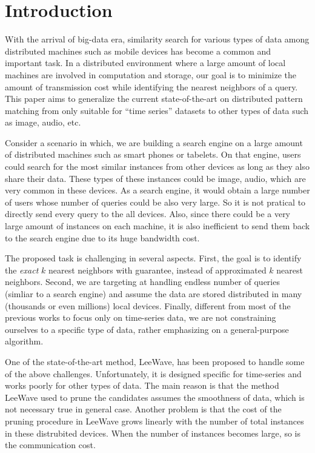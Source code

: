 \chapter{Introduction}
\label{c:intro}

With the arrival of big-data era, similarity search for various types of data among distributed machines such as  mobile devices has become a common and important task.  In a distributed environment where a large amount of local machines are involved in computation and storage, our goal is to minimize the amount of transmission cost while identifying the nearest neighbors of a query. This paper aims to generalize the current state-of-the-art on distributed pattern matching from only suitable for ``time series''  datasets to other types of data such as image, audio, etc.


Consider a scenario in which, we are building a search engine on a large amount of distributed machines such as smart phones or tabelets.  On that engine, users could search for the most similar instances from other devices as long as they also share their data.  These types of these instances could be image, audio, which are very common in these devices. As a search engine, it would obtain a large number of users whose number of queries could be also very large.  So it is not pratical to directly send every query to the all devices.  Also, since there could be a very large amount of instances on each machine, it is also inefficient to send them back to the search engine due to its huge bandwidth cost.

The proposed task is challenging in several aspects. First, the goal is to identify the \emph{exact} $k$ nearest neighbors with guarantee, instead of approximated $k$ nearest neighbors.  Second, we are targeting at handling endless number of queries (simliar to a search engine) and assume the data are stored distributed in many (thousands or even millions) local devices.  Finally, different from most of the previous works to focus only on time-series data, we are not constraining ourselves to a specific type of data, rather emphasizing on a general-purpose algorithm.

One of the state-of-the-art method, LeeWave,\cite{LeeWave} has been proposed to handle some of the above challenges.  Unfortunately, it is designed specific for time-series and works poorly for other types of data.  The main reason is that the method LeeWave used to prune the candidates assumes the smoothness of data, which is not necessary true in general case.  Another problem is that the cost of the pruning procedure in LeeWave grows linearly with the number of total instances in these distrubited devices.  When the number of instances becomes large, so is the communication cost.

